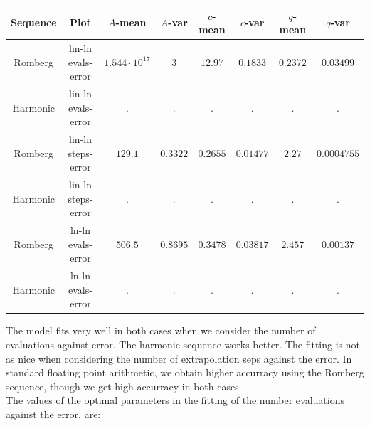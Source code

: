 \begin{table}[H]
    \centering
    \small
    \begin{tabular}{c|c||c|c|c|c|c|c}
Sequence & Plot & \(A\)-mean & \(A\)-var & \(c\)-mean & \(c\)-var & \(q\)-mean & \(q\)-var\\\hline
Romberg & lin-ln evals-error & \(1.544\cdot 10^{17}\) & \(3\) & \(12.97\) & \(0.1833\) & \(0.2372\) & \(0.03499\) \\
Harmonic & lin-ln evals-error & . & . & . & . & . & . \\
Romberg & lin-ln steps-error & \(129.1\) & \(0.3322\) & \(0.2655\) & \(0.01477\) & \(2.27\) & \(0.0004755\) \\
Harmonic & lin-ln steps-error & . & . & . & . & . & . \\
Romberg & ln-ln evals-error & \(506.5\) & \(0.8695\) & \(0.3478\) & \(0.03817\) & \(2.457\) & \(0.00137\) \\
Harmonic & ln-ln evals-error & . & . & . & . & . & . \\
    \end{tabular}
    \label{tab:my_label}
\end{table}

The model fits very well in both cases when we consider the number of evaluations against error. The harmonic sequence works better. The fitting is not as nice when considering the number of extrapolation seps against the error. In standard floating point arithmetic, we obtain higher accurracy using the Romberg sequence, though we get high accurracy in both cases.\\

The values of the optimal parameters in the fitting of the number evaluations against the error, are:

